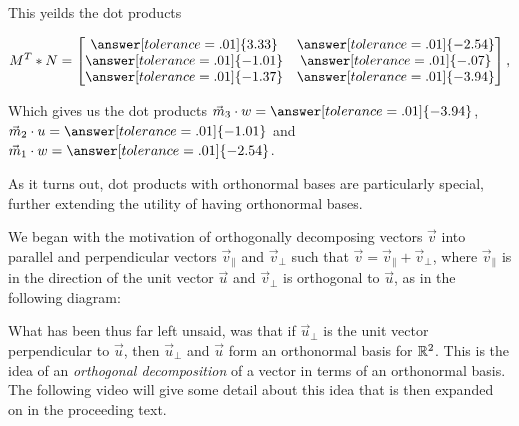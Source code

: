 \documentclass{ximera}
\begin{document}
\begin{example}
   This yeilds the dot products

   $$M^T*N=\begin{bmatrix}
      \answer[tolerance=.01]{3.33}&\answer[tolerance=.01]{-2.54}\\\answer[tolerance=.01]{-1.01}&\answer[tolerance=.01]{-.07}\\
      \answer[tolerance=.01]{-1.37}&\answer[tolerance=.01]{-3.94}
   \end{bmatrix},$$

   Which gives us the dot products $\vec{m}_3\cdot w=\answer[tolerance=.01]{-3.94}$, $\vec{m}_2\cdot u=\answer[tolerance=.01]{-1.01}$ and $\vec{m}_1\cdot w=\answer[tolerance=.01]{-2.54}$.

\end{example}

As it turns out, dot products with orthonormal bases are particularly special, further extending the utility of having orthonormal bases.

We began with the motivation of orthogonally decomposing vectors $\vec{v}$ into parallel and perpendicular vectors $\vec{v}_\parallel$ and $\vec{v}_\perp$ such that $\vec{v}=\vec{v}_\parallel+\vec{v}_\perp$, where $\vec{v}_\parallel$ is in the direction of the unit vector $\vec{u}$ and $\vec{v}_\perp$ is orthogonal to $\vec{u}$, as in the following diagram:

\begin{center}
   
  \end{center}

What has been thus far left unsaid, was that if $\vec{u}_\perp$ is the unit vector perpendicular to $\vec{u}$, then $\vec{u}_\perp$ and $\vec{u}$ form an orthonormal basis for $\mathbb{R}^2$. This is the idea of an \emph{orthogonal decomposition} of a vector in terms of an orthonormal basis. The following video will give some detail about this idea that is then expanded on in the proceeding text.
\end{document}
